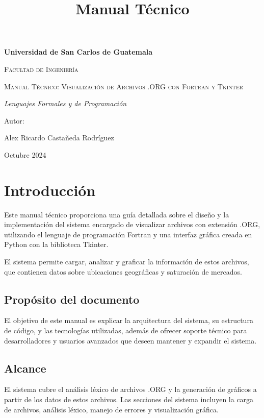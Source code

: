 \documentclass[12pt, letterpaper, twosite]{article}
\date{}
\title{Manual Técnico}
\begin{document}
\begin{titlepage}
      \centering
      \vspace{1cm}
      {\bfseries\LARGE Universidad de San Carlos de Guatemala \par}
      \vspace{1cm}
      {\scshape\Large Facultad de Ingeniería \par}
      \vspace{3cm}
      {\scshape\Huge Manual Técnico: Visualización de Archivos .ORG con Fortran y Tkinter \par}
      \vspace{3cm}
      {\itshape\Large Lenguajes Formales y de Programación \par}
      \vfill
      {\Large Autor: \par}
      {\Large Alex Ricardo Castañeda Rodríguez \par}
      \vfill
      {\Large Octubre 2024 \par}
\end{titlepage}

\tableofcontents

\newpage

\section{Introducción}
Este manual técnico proporciona una guía detallada sobre el diseño y la implementación del sistema encargado de visualizar archivos con extensión .ORG, utilizando el lenguaje de programación Fortran y una interfaz gráfica creada en Python con la biblioteca Tkinter. 

El sistema permite cargar, analizar y graficar la información de estos archivos, que contienen datos sobre ubicaciones geográficas y saturación de mercados.

\subsection{Propósito del documento}
El objetivo de este manual es explicar la arquitectura del sistema, su estructura de código, y las tecnologías utilizadas, además de ofrecer soporte técnico para desarrolladores y usuarios avanzados que deseen mantener y expandir el sistema.

\subsection{Alcance}
El sistema cubre el análisis léxico de archivos .ORG y la generación de gráficos a partir de los datos de estos archivos. Las secciones del sistema incluyen la carga de archivos, análisis léxico, manejo de errores y visualización gráfica.
\end{document}

